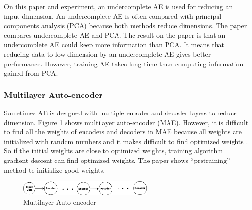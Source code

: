 \documentclass[draft,dvipsnames]{drexel-thesis}
\begin{document}
\begin{thesis}
On this paper and experiment, an undercomplete AE is used for reducing an input dimension. An undercomplete AE is often compared with principal components analysis (PCA) because both methods reduce dimensions. The paper \cite{hinton2006reducing} compares undercomplete AE and PCA. The result on the paper is that an undercomplete AE could keep more information than PCA. It means that reducing data to low dimension by an undercomplete AE gives better performance. However, training AE takes long time than computing information gained from PCA.



\subsubsection{Multilayer Auto-encoder}\label{subsubsec:MAE}
	Sometimes AE is designed with multiple encoder and decoder layers to reduce dimension. Figure \ref{fig:MAE} shows multilayer auto-encoder (MAE). However, it is difficult to find all the weights of encoders and decoders in MAE because all weights are initialized with random numbers and it makes difficult to find optimized weights \cite{zaremba2014recurrent}. So if the initial weights are close to optimized weights, training algorithm gradient descent can find optimized weights. The paper \cite{zaremba2014recurrent} shows ``pretraining'' method to initialize good weights.

\begin{figure}[t!]
    \centering
    \includegraphics[width=0.6\textwidth]{pictures/figures/MAE.png}
    \caption{Multilayer Auto-encoder}
    \label{fig:MAE}
\end{figure}


\end{thesis}
\end{document}
